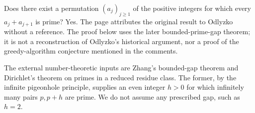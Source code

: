 Does there exist a permutation $(a_j)_{j\ge1}$ of the positive integers for which every $a_j+a_{j+1}$ is prime? Yes. The page attributes the original result to Odlyzko without a reference. The proof below uses the later bounded-prime-gap theorem; it is not a reconstruction of Odlyzko's historical argument, nor a proof of the greedy-algorithm conjecture mentioned in the comments.

The external number-theoretic inputs are Zhang's bounded-gap theorem and Dirichlet's theorem on primes in a reduced residue class. The former, by the infinite pigeonhole principle, supplies an even integer $h>0$ for which infinitely many pairs $p,p+h$ are prime. We do not assume any prescribed gap, such as $h=2$.
